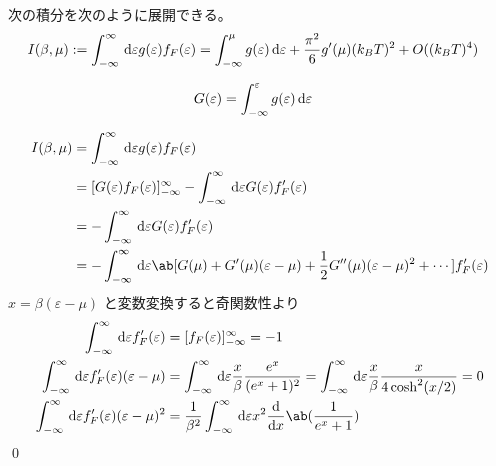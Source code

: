 \documentclass[uplatex,diffipdfmx,a4paper,11pt]{jlreq}
\makeatletter
\numberwithin{equation}{section}
\theoremstyle{definition}
\renewenvironment{proof}[1][\proofname]{\par
  \normalfont
  \topsep6\p@\@plus6\p@ \trivlist
  \item[\hskip\labelsep{\bfseries #1}\@addpunct{\bfseries}]\ignorespaces\quad\par
}{%
  \qed\endtrivlist\@endpefalse
}
\renewcommand\proofname{証明}
\makeatother
\begin{document}
\begin{theorem}[ゾンマーフェルト展開]
  次の積分を次のように展開できる。
  \begin{align}
    I(\beta, \mu) & := \int_{-\infty}^{\infty}\dl{\varepsilon}g(\varepsilon)f_F(\varepsilon) = \int_{-\infty}^\mu g(\varepsilon)\dl{\varepsilon} + \frac{\pi^2}{6}g'(\mu)(k_BT)^2 + O((k_BT)^{4})
  \end{align}
\end{theorem}
\begin{proof}
  \begin{align}
    G(\varepsilon) & = \int_{-\infty}^\varepsilon g(\varepsilon)\dl{\varepsilon}
  \end{align}

  \begin{align}
    I(\beta, \mu) & = \int_{-\infty}^{\infty}\dl{\varepsilon}g(\varepsilon)f_F(\varepsilon)                                                                                  \\
                  & = [G(\varepsilon)f_F(\varepsilon)]_{-\infty}^{\infty} - \int_{-\infty}^{\infty}\dl{\varepsilon}G(\varepsilon)f_F'(\varepsilon)                           \\
                  & = - \int_{-\infty}^{\infty}\dl{\varepsilon}G(\varepsilon)f_F'(\varepsilon)                                                                               \\
                  & = - \int_{-\infty}^{\infty}\dl{\varepsilon}\ab[G(\mu) + G'(\mu)(\varepsilon - \mu) + \frac{1}{2}G''(\mu)(\varepsilon - \mu)^2 + \cdots]f_F'(\varepsilon)
  \end{align}
  $x = \beta(\varepsilon - \mu)$ と変数変換すると奇関数性より
  \begin{align}
    \int_{-\infty}^{\infty}\dl{\varepsilon}f_F'(\varepsilon)                      & = [f_F(\varepsilon)]_{-\infty}^{\infty} = -1                                                                                                                        \\
    \int_{-\infty}^{\infty}\dl{\varepsilon}f_F'(\varepsilon)(\varepsilon - \mu)   & = \int_{-\infty}^{\infty}\dl{\varepsilon}\frac{x}{\beta}\frac{e^x}{(e^x + 1)^2} = \int_{-\infty}^{\infty}\dl{\varepsilon}\frac{x}{\beta}\frac{x}{4\cosh^2(x/2)} = 0 \\
    \int_{-\infty}^{\infty}\dl{\varepsilon}f_F'(\varepsilon)(\varepsilon - \mu)^2 & = \frac{1}{\beta^2}\int_{-\infty}^{\infty}\dl{\varepsilon}x^2\diff{}{x}\ab(\frac{1}{e^x + 1})                                                                       \\

\end{align}
\end{proof}
\end{document}
